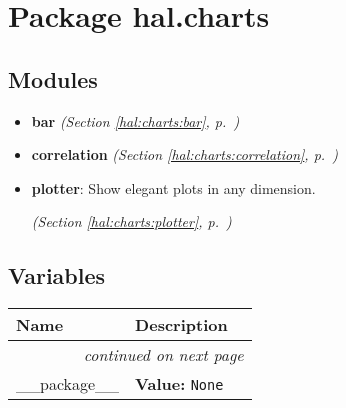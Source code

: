 %
%
%


\section{Package hal.charts}

    \label{hal:charts}


\subsection{Modules}

\begin{itemize}
\setlength{\parskip}{0ex}
\item \textbf{bar}
  \textit{(Section \ref{hal:charts:bar}, p.~\pageref{hal:charts:bar})}

\item \textbf{correlation}
  \textit{(Section \ref{hal:charts:correlation}, p.~\pageref{hal:charts:correlation})}

\item \textbf{plotter}: Show elegant plots in any dimension. 


  \textit{(Section \ref{hal:charts:plotter}, p.~\pageref{hal:charts:plotter})}

\end{itemize}



  \subsection{Variables}

    \vspace{-1cm}
\hspace{\varindent}\begin{longtable}{|p{\varnamewidth}|p{\vardescrwidth}|l}
\cline{1-2}
\cline{1-2} \centering \textbf{Name} & \centering \textbf{Description}& \\
\cline{1-2}
\endhead\cline{1-2}\multicolumn{3}{r}{\small\textit{continued on next page}}\\\endfoot\cline{1-2}
\endlastfoot\raggedright \_\-\_\-p\-a\-c\-k\-a\-g\-e\-\_\-\_\- & \raggedright \textbf{Value:} 
{\tt None}&\\
\cline{1-2}
\end{longtable}

